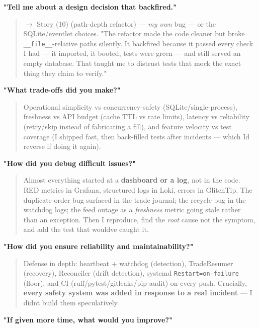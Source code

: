 \documentclass[11pt]{article}
\begin{document}
\textbf{"Tell me about a design decision that backfired."}

\begin{quote}
\(\rightarrow\) Story (10) (path-depth refactor) --- \emph{my own} bug --- or the SQLite/eventlet choices. "The refactor
made the code cleaner but broke \texttt{\_\_file\_\_}-relative paths silently. It backfired because it
passed every check I had --- it imported, it booted, tests were green --- and still served an empty
database. That taught me to distrust tests that mock the exact thing they claim to verify."
\end{quote}

\textbf{"What trade-offs did you make?"}

\begin{quote}
Operational simplicity vs concurrency-safety (SQLite/single-process), freshness vs API budget
(cache TTL vs rate limits), latency vs reliability (retry/skip instead of fabricating a fill),
and feature velocity vs test coverage (I shipped fast, then back-filled tests after incidents ---
which I\textquotesingle d reverse if doing it again).
\end{quote}

\textbf{"How did you debug difficult issues?"}

\begin{quote}
Almost everything started at a \textbf{dashboard or a log}, not in the code. RED metrics in Grafana,
structured logs in Loki, errors in GlitchTip. The duplicate-order bug surfaced in the trade
journal; the recycle bug in the watchdog logs; the feed outage as a \emph{freshness} metric going
stale rather than an exception. Then I reproduce, find the \emph{root} cause not the symptom, and add
the test that would\textquotesingle ve caught it.
\end{quote}

\textbf{"How did you ensure reliability and maintainability?"}

\begin{quote}
Defense in depth: heartbeat + watchdog (detection), TradeResumer (recovery), Reconciler (drift
detection), systemd \texttt{Restart=on-failure} (floor), and CI (ruff/pytest/gitleaks/pip-audit) on
every push. Crucially, \textbf{every safety system was added in response to a real incident} --- I
didn\textquotesingle t build them speculatively.
\end{quote}

\textbf{"If given more time, what would you improve?"}
\end{document}
